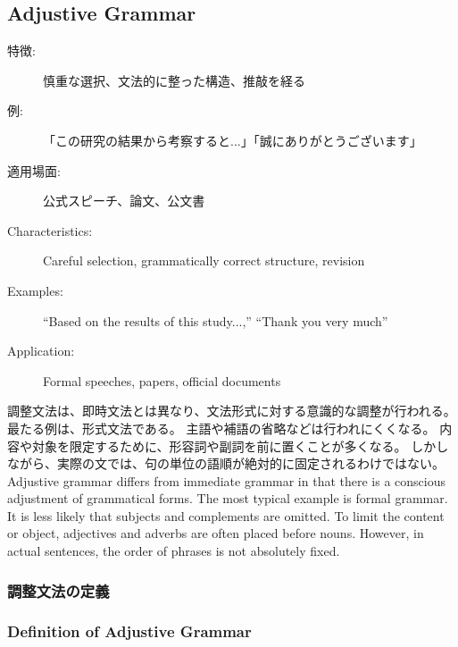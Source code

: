 \documentclass[a4paper,xelatex,ja=standard]{bxjsarticle}
\begin{document}
  \subsection{Adjustive Grammar}
\fi

\ifJPN
  \begin{description}
    \item[特徴:] 慎重な選択、文法的に整った構造、推敲を経る
    \item[例:] 「この研究の結果から考察すると...」「誠にありがとうございます」
    \item[適用場面:] 公式スピーチ、論文、公文書
  \end{description}
\else
  \begin{description}
    \item[Characteristics:] Careful selection, grammatically correct structure, revision
    \item[Examples:] ``Based on the results of this study...,'' ``Thank you very much''
    \item[Application:] Formal speeches, papers, official documents
  \end{description}
\fi

%

\ifJPN
調整文法は、即時文法とは異なり、文法形式に対する意識的な調整が行われる。
最たる例は、形式文法である。
主語や補語の省略などは行われにくくなる。
内容や対象を限定するために、形容詞や副詞を前に置くことが多くなる。
しかしながら、実際の文では、句の単位の語順が絶対的に固定されるわけではない。
\else
Adjustive grammar differs from immediate grammar in that there is a conscious adjustment of grammatical forms.
The most typical example is formal grammar.
It is less likely that subjects and complements are omitted.
To limit the content or object, adjectives and adverbs are often placed before nouns.
However, in actual sentences, the order of phrases is not absolutely fixed.
\fi

\ifJPN
\subsubsection{調整文法の定義}
\else
\subsubsection{Definition of Adjustive Grammar}
\fi
\end{document}
